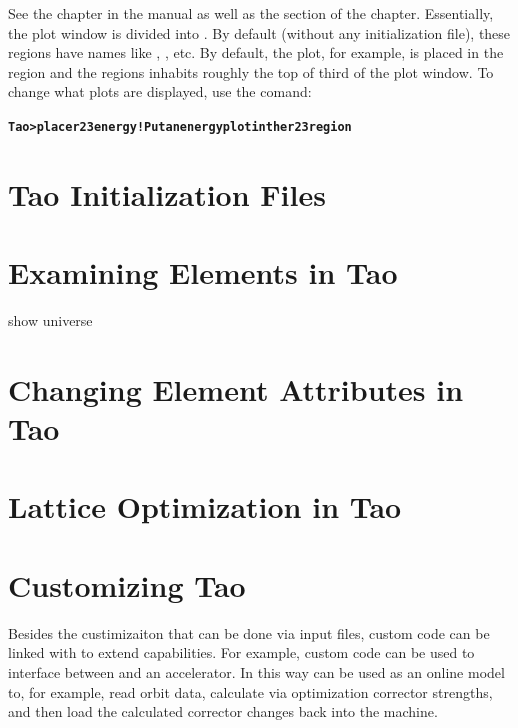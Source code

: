 \documentclass{hitec}
\newcommand{\BF}[1]{{\normalfont\textbf{#1}}}
\newenvironment{display}
  {\vspace*{-1.5ex} \begin{alltt}}
  {\end{alltt} \vspace*{-1.0ex}}
\begin{document}
See the  chapter in the \tao manual as well as the  section of the  chapter. Essentially, the plot window is
divided into . By default (without any initialization file), these regions
have names like , , etc. By default, the  plot, for example, is
placed in the  region and the  regions inhabits roughly the top of third
of the plot window. To change what plots are displayed, use the  comand:
\begin{display}
  \BF{Tao> place r23 energy  ! Put an energy plot in the r23 region}
\end{display}

\section{Tao Initialization Files}



\section{Examining Elements in Tao}

show universe

\section{Changing Element Attributes in Tao}

\section{Lattice Optimization in Tao}


\section{Customizing Tao}

Besides the custimizaiton that can be done via \tao input files, \tao custom code
can be linked with \tao to extend \tao capabilities. For example, custom code can
be used to interface between \tao and an accelerator. In this way \tao can be used
as an online model to, for example, read orbit data, calculate via optimization corrector
strengths, and then load the calculated corrector changes back into the machine.
\end{document}
